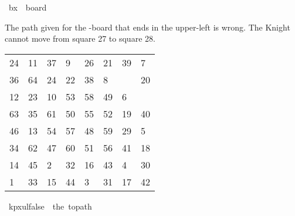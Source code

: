 \begin{isabellebody}
\ {\isachardoublequoteopen}b{}x{}\ {\isasymequiv}\ board\ {}\ {}{\isachardoublequoteclose}%
\begin{isamarkuptext}%
The path given for the -board that ends in the upper-left is wrong. The Knight cannot 
move from square 27 to square 28.
  \begin{table}[H]
    \begin{tabular}{llllllll}
      24 & 11 & 37 &  9 & 26 & 21 & 39 &  7 \\
      36 & 64 & 24 & 22 & 38 &  8 & \color{red}{27} & 20 \\
      12 & 23 & 10 & 53 & 58 & 49 &  6 & \color{red}{28} \\
      63 & 35 & 61 & 50 & 55 & 52 & 19 & 40 \\
      46 & 13 & 54 & 57 & 48 & 59 & 29 &  5 \\
      34 & 62 & 47 & 60 & 51 & 56 & 41 & 18 \\
      14 & 45 &  2 & 32 & 16 & 43 &  4 & 30 \\
       1 & 33 & 15 & 44 &  3 & 31 & 17 & 42
    \end{tabular}
  \end{table}%
\end{isamarkuptext}\isamarkuptrue%
\isamarkupfalse%
\ {\isachardoublequoteopen}kp{}x{}ul{\isacharunderscore}{\kern0pt}false\ {\isasymequiv}\ the\ {\isacharparenleft}{\kern0pt}to{\isacharunderscore}{\kern0pt}path\ \isanewline
\ \ {\isacharbrackleft}{\kern0pt}{\isacharbrackleft}{\kern0pt}{}{}{\isacharcomma}{\kern0pt}{}{}{\isacharcomma}{\kern0pt}{}{}{\isacharcomma}{\kern0pt}{}{\isacharcomma}{\kern0pt}{}{}{\isacharcomma}{\kern0pt}{}{}{\isacharcomma}{\kern0pt}{}{}{\isacharcomma}{\kern0pt}{}{\isacharbrackright}{\kern0pt}{\isacharcomma}{\kern0pt}\isanewline
\ \ {\isacharbrackleft}{\kern0pt}{}{}{\isacharcomma}{\kern0pt}{}{}{\isacharcomma}{\kern0pt}{}{}{\isacharcomma}{\kern0pt}{}{}{\isacharcomma}{\kern0pt}{}{}{\isacharcomma}{\kern0pt}{}{\isacharcomma}{\kern0pt}{}{}{\isacharcomma}{\kern0pt}{}{}{\isacharbrackright}{\kern0pt}{\isacharcomma}{\kern0pt}\isanewline
\ \ {\isacharbrackleft}{\kern0pt}{}{}{\isacharcomma}{\kern0pt}{}{}{\isacharcomma}{\kern0pt}{}{}{\isacharcomma}{\kern0pt}{}{}{\isacharcomma}{\kern0pt}{}{}{\isacharcomma}{\kern0pt}{}{}{\isacharcomma}{\kern0pt}{}{\isacharcomma}{\kern0pt}{}{}{\isacharbrackright}{\kern0pt}{\isacharcomma}{\kern0pt}\isanewline

\end{isabellebody}
